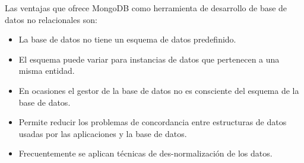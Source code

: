 \documentclass[12pt, a4paper, titlepage]{report}
\begin{document}
		   	Las ventajas que ofrece MongoDB como herramienta de desarrollo de base de datos no relacionales son:
		   	\begin{itemize}
		   		\item La base de datos no tiene un esquema de datos predefinido.
		   		\item El esquema puede variar para instancias de datos que pertenecen a una misma entidad.
		   		\item En ocasiones el gestor de la base de datos no es consciente del esquema de la base de datos.
		   		\item Permite reducir los problemas de concordancia entre estructuras de datos usadas por las aplicaciones y la base de datos.
		   		\item Frecuentemente se aplican técnicas de des-normalización de los datos.
		   	\end{itemize}

		   	
\end{document}
